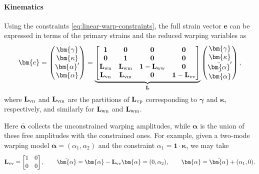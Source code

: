 \paragraph{Kinematics}
Using the constraints \eqref{eq:linear-warp-constraints}, the full strain vector $\bm{e}$ can be expressed in terms of the primary strains and the reduced warping variables as
\begin{equation}
  \bm{e}
  =
  \begin{pmatrix}
    \bm{\gamma} \\ \bm{\kappa} \\ \bm{\alpha}' \\ \bm{\alpha}
  \end{pmatrix}
  =
  \underbrace{
  \begin{bmatrix}
    \mathbf{1} & \mathbf{0} & \mathbf{0} & \mathbf{0} \\
    \mathbf{0} & \mathbf{1} & \mathbf{0} & \mathbf{0} \\
    \mathbf{L}_{\rm wn} & \mathbf{L}_{\rm wm} & \mathbf{1}-\mathbf{L}_{\rm ww} & \mathbf{0} \\
    \mathbf{L}_{\rm vn} & \mathbf{L}_{\rm vm} & \mathbf{0} & \mathbf{1}-\mathbf{L}_{\rm vv}
  \end{bmatrix}
  }_{\mathbf{L}}
  \begin{pmatrix}
    \bm{\gamma} \\ \bm{\kappa} \\ \bar{\bm{\alpha}}' \\ \bar{\bm{\alpha}}
  \end{pmatrix},
  \label{eq:warping-projection}
\end{equation}
where $\mathbf{L}_{\rm vn}$ and $\mathbf{L}_{\rm vm}$ are the partitions of $\mathbf{L}_{\rm vp}$ corresponding to $\bm{\gamma}$ and $\bm{\kappa}$, respectively, and similarly for $\mathbf{L}_{\rm wn}$ and $\mathbf{L}_{\rm wm}$.

\begin{remark}
Here $\bar{\bm{\alpha}}$ collects the unconstrained warping amplitudes, while $\bm{\alpha}$ is the union of these free amplitudes with the constrained ones.
For example, given a two-mode warping model $\bm{\alpha} = (\alpha_1,\alpha_2)$ and the constraint
$\alpha_1 = \mathbf{1}\cdot\bm{\kappa}$, we may take
\[
  \mathbf{L}_{\rm vv}
  =
  \begin{bmatrix}
    1 & 0 \\[0.3ex]
    0 & 0
  \end{bmatrix},
  \qquad
  \bar{\bm{\alpha}}
    = \bm{\alpha} - \mathbf{L}_{\rm vv}\bm{\alpha}
    = (0,\alpha_2),
  \qquad
  \bm{\alpha}
    = \bar{\bm{\alpha}} + (\alpha_1,0).
\]
\end{remark}

